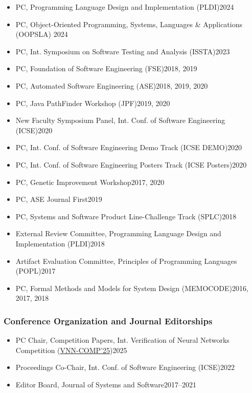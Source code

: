 \documentclass[11pt]{article}
\begin{document}
\begin{itemize}
    \item PC, Programming Language Design and Implementation (PLDI)\hfill 2024
    \item PC, Object-Oriented Programming, Systems, Languages \& Applications (OOPSLA) \hfill 2024
    \item PC,  Int. Symposium on Software Testing and Analysis (ISSTA)\hfill 2023
    \item PC, Foundation of Software Engineering (FSE)\hfill 2018, 2019
    \item PC, Automated Software Engineering (ASE)\hfill 2018, 2019, 2020
    \item PC, Java PathFinder Workshop (JPF)\hfill 2019, 2020
    \item New Faculty Symposium Panel, Int. Conf. of Software Engineering (ICSE)\hfill 2020
    \item PC, Int. Conf. of Software Engineering Demo Track (ICSE DEMO)\hfill 2020
    \item PC, Int. Conf. of Software Engineering Posters Track (ICSE Posters)\hfill 2020
    \item PC, Genetic Improvement Workshop\hfill 2017, 2020
    \item PC, ASE Journal First\hfill 2019
    \item PC, Systems and Software Product Line-Challenge Track (SPLC)\hfill 2018
    \item External Review Committee, Programming Language Design and Implementation (PLDI)\hfill 2018
    \item Artifact Evaluation Committee, Principles of Programming Languages (POPL)\hfill 2017
    \item PC, Formal Methods and Models for System Design (MEMOCODE)\hfill 2016, 2017, 2018
\end{itemize}

\subsubsection{Conference Organization and Journal Editorships}
\begin{itemize}
    \item PC Chair, Competition Papers, Int. Verification of Neural Networks Competition (\href{https://sites.google.com/view/vnn2025}{VNN-COMP'25})\hfill 2025
    \item Proceedings Co-Chair,  Int. Conf. of Software Engineering (ICSE)\hfill 2022
    \item Editor Board, Journal of Systems and Software\hfill 2017--2021
\end{itemize}
\end{document}
